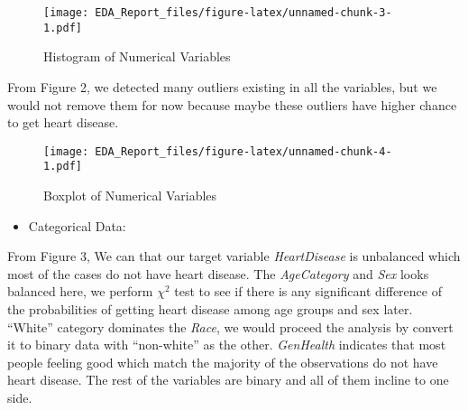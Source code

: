 \documentclass[
  11pt,
]{article}
\providecommand{\tightlist}{%
  \setlength{\itemsep}{0pt}\setlength{\parskip}{0pt}}
\begin{document}
\begin{table}

\caption{\label{tab:unnamed-chunk-2}Statistics for Numerical Variables}
\centering
{}
\end{table}

\begin{figure}
\centering
\texttt{[image: EDA\_Report\_files/figure-latex/unnamed-chunk-3-1.pdf]}
\caption{Histogram of Numerical Variables}
\end{figure}

From Figure 2, we detected many outliers existing in all the variables,
but we would not remove them for now because maybe these outliers have
higher chance to get heart disease.

\begin{figure}
\centering
\texttt{[image: EDA\_Report\_files/figure-latex/unnamed-chunk-4-1.pdf]}
\caption{Boxplot of Numerical Variables}
\end{figure}

\begin{itemize}
\tightlist
\item
  Categorical Data:
\end{itemize}

From Figure 3, We can that our target variable \emph{HeartDisease} is
unbalanced which most of the cases do not have heart disease. The
\emph{AgeCategory} and \emph{Sex} looks balanced here, we perform
\(\chi^2\) test to see if there is any significant difference of the
probabilities of getting heart disease among age groups and sex later.
``White'' category dominates the \emph{Race}, we would proceed the
analysis by convert it to binary data with ``non-white'' as the other.
\emph{GenHealth} indicates that most people feeling good which match the
majority of the observations do not have heart disease. The rest of the
variables are binary and all of them incline to one side.
\end{document}

